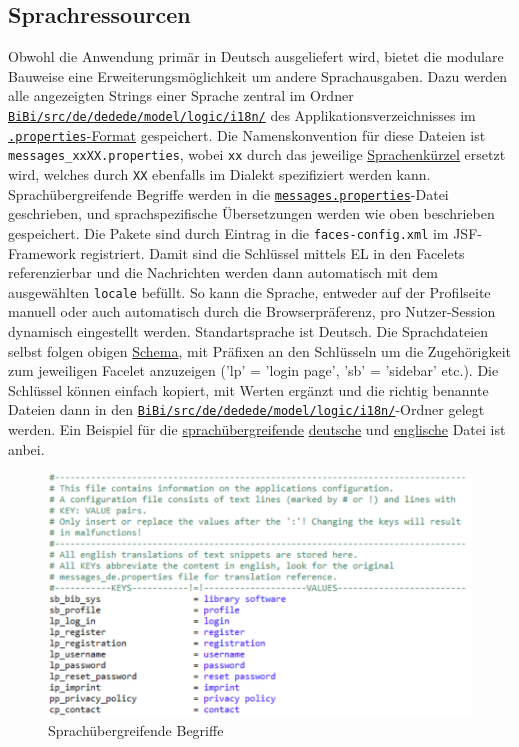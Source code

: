 \documentclass{article}
\begin{document}
\subsection{Sprachressourcen}
\indent Obwohl die Anwendung primär in Deutsch ausgeliefert wird, bietet die modulare Bauweise eine Erweiterungsmöglichkeit um andere Sprachausgaben. Dazu werden alle angezeigten Strings einer Sprache zentral im Ordner \hyperlink{Paketstruktur}{\texttt{BiBi/src/de/dedede/model/logic/i18n/}} des Applikationsverzeichnisses im \hyperlink{https://de.wikipedia.org/wiki/Java-Properties-Datei}{\texttt{.properties}-Format} gespeichert. Die Namenskonvention für diese Dateien ist \texttt{messages\_xxXX.properties}, wobei \texttt{xx} durch das jeweilige \hyperlink{https://de.wikipedia.org/wiki/Liste_der_ISO-639-1-Codes}{Sprachenkürzel} ersetzt wird, welches durch \texttt{XX} ebenfalls im Dialekt spezifiziert werden kann. Sprachübergreifende Begriffe werden in die \hyperlink{messages}{\texttt{messages.properties}}-Datei geschrieben, und sprachspezifische Übersetzungen werden wie oben beschrieben gespeichert. Die Pakete sind durch Eintrag in die \texttt{faces-config.xml} im JSF-Framework registriert. Damit sind die Schlüssel mittels EL in den Facelets referenzierbar und die Nachrichten werden dann automatisch mit dem ausgewählten \texttt{locale} befüllt.  So kann die Sprache, entweder auf der Profilseite manuell oder auch automatisch durch die Browserpräferenz, pro Nutzer-Session dynamisch eingestellt werden. Standartsprache ist Deutsch. Die Sprachdateien selbst folgen obigen \hyperlink{propSchema}{Schema}, mit Präfixen an den Schlüsseln um die Zugehörigkeit zum jeweiligen Facelet anzuzeigen ('lp' = 'login page', 'sb' = 'sidebar' etc.). Die Schlüssel können einfach kopiert, mit Werten ergänzt und die richtig benannte Dateien dann in den \hyperlink{Paketstruktur}{\texttt{BiBi/src/de/dedede/model/logic/i18n/}}-Ordner gelegt werden. Ein Beispiel für die \hyperlink{messages}{sprachübergreifende} \hyperlink{messagesde}{deutsche} und \hyperlink{messagesen}{englische} Datei ist anbei.\\
\begin{figure}[H]
\hypertarget{messages}{}
\centering
\includegraphics[width=50em]{messagesen}
\caption{Sprachübergreifende Begriffe}
\end{figure}
\end{document}

